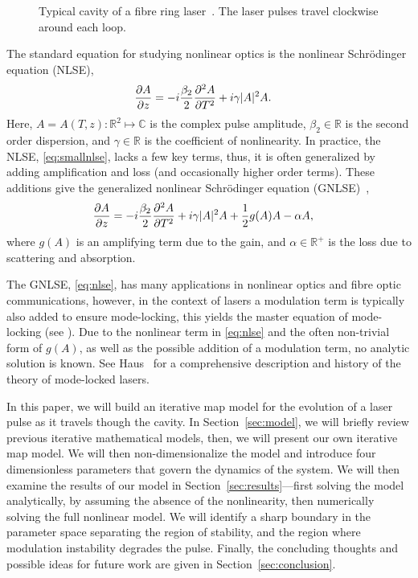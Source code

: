 \documentclass[9pt,twocolumn,twoside]{osajnl}
\newcommand{\pdiff}[3][\hspace{-0.5pt}]{\frac{\partial^{#1}#2}{\partial{#3}^{#1}}} %
\begin{document}
\begin{figure}[tbp]
	\centering
	
	\caption{Typical cavity of a fibre ring laser~\cite{burgoyne2014, chung2017, lapre2019, shao2019}. The laser pulses travel clockwise around each loop.}
	\label{fig:cavity}
\end{figure}

The standard equation for studying nonlinear optics is the nonlinear Schr\"odinger equation (NLSE),
\begin{align}
	\pdiff{A}{z} &= - i \frac{\beta_2}{2}\pdiff[2]{A}{T} + i \gamma |A|^2 A.
	\label{eq:smallnlse}
\end{align}
Here, $A = A(T, z) : \mathbb{R}^2 \mapsto \mathbb{C}$ is the complex pulse amplitude, $\beta_2 \in \mathbb{R}$ is the second order dispersion, and $\gamma \in \mathbb{R}$ is the coefficient of nonlinearity. In practice, the NLSE, \eqref{eq:smallnlse}, lacks a few key terms, thus, it is often generalized by adding amplification and loss (and occasionally higher order terms). These additions give the generalized nonlinear Schr\"odinger equation (GNLSE)~\cite{agrawal2013, bohun2015, finot2008, peng2018, shtyrina2017, yarutkina2013},
	\begin{align}
	\pdiff{A}{z} &= - i \frac{\beta_2}{2}\pdiff[2]{A}{T} + i \gamma |A|^2 A + \frac{1}{2}g(A) A - \alpha A,
	\label{eq:nlse}
\end{align}
where $g(A)$ is an amplifying term due to the gain, and $\alpha \in \mathbb{R}^+$ is the loss due to scattering and absorption.

The GNLSE, \eqref{eq:nlse}, has many applications in nonlinear optics and fibre optic communications, however, in the context of lasers a modulation term is typically also added to ensure mode-locking, this yields the master equation of mode-locking (see \cite{haus1984, haus1975, haus1986, haus1992, haus2000, tamura1996, usechak2005}). Due to the nonlinear term in \eqref{eq:nlse} and the often non-trivial form of $g(A)$, as well as the possible addition of a modulation term, no analytic solution is known. See Haus~\cite{haus2000} for a comprehensive description and history of the theory of mode-locked lasers.

In this paper, we will build an iterative map model for the evolution of a laser pulse as it travels though the cavity. In Section~\ref{sec:model}, we will briefly review previous iterative mathematical models, then, we will present our own iterative map model. We will then non-dimensionalize the model and introduce four dimensionless parameters that govern the dynamics of the system. We will then examine the results of our model in Section~\ref{sec:results}---first solving the model analytically, by assuming the absence of the nonlinearity, then numerically solving the full nonlinear model. We will identify a sharp boundary in the parameter space separating the region of stability, and the region where modulation instability degrades the pulse. Finally, the concluding thoughts and possible ideas for future work are given in Section~\ref{sec:conclusion}.
\end{document}
